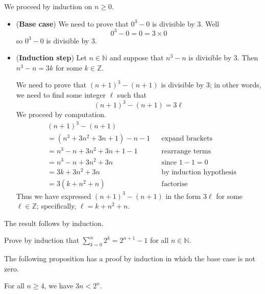 \begin{cproof}
We proceed by induction on $n \ge 0$.
\begin{itemize}
\item (\textbf{Base case}) We need to prove that $0^3-0$ is divisible by $3$. Well
\[ 0^3-0 = 0 = 3 \times 0 \]
so $0^3-0$ is divisible by $3$.

\item (\textbf{Induction step}) Let $n \in \mathbb{N}$ and suppose that $n^3-n$ is divisible by $3$. Then $n^3-n = 3k$ for some $k \in \mathbb{Z}$.

We need to prove that $(n+1)^3 - (n+1)$ is divisible by $3$; in other words, we need to find some integer $\ell$ such that
\[ (n+1)^3 - (n+1) = 3\ell \]
We proceed by computation.
\begin{align*}
& (n+1)^3 - (n+1) && \\
&= (n^3 + 3n^2 + 3n + 1) - n - 1 && \text{expand brackets}\\
&= n^3 - n + 3n^2 + 3n + 1 - 1 && \text{rearrange terms} \\
&= n^3 - n + 3n^2 + 3n && \text{since $1 - 1 = 0$} \\
&= 3k + 3n^2 + 3n && \text{by induction hypothesis} \\
&= 3(k+n^2+n) && \text{factorise}
\end{align*}
Thus we have expressed $(n+1)^3-(n+1)$ in the form $3\ell$ for some $\ell \in \mathbb{Z}$; specifically, $\ell=k+n^2+n$.
\end{itemize}

The result follows by induction.
\end{cproof}

\begin{exercise}
\label{exSumOfPowersOf2}
Prove by induction that $\displaystyle \sum_{k=0}^n 2^k = 2^{n+1} - 1$ for all $n \in \mathbb{N}$.
\end{exercise}

The following proposition has a proof by induction in which the base case is not zero.

\begin{proposition}
\label{propWeakInductionNonzeroBaseCaseExample}
For all $n \ge 4$, we have $3n < 2^n$.
\end{proposition}

